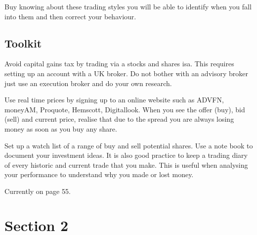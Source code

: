 Buy knowing about these trading styles you will be able to identify when you fall into them and then correct your behaviour.

\subsection*{Toolkit}
Avoid capital gains tax by trading via a stocks and shares isa. This requires setting up an account with a UK broker.
Do not bother with an advisory broker just use an execution broker and do your own research.

Use real time prices by signing up to an online website such as ADVFN, moneyAM, Proquote, Hemscott, Digitallook.
When you see the offer (buy), bid (sell) and current price, realise that due to the spread you are always losing money as soon as you buy any share.

Set up a watch list of a range of buy and sell potential shares.
Use a note book to document your investment ideas. 
It is also good practice to keep a trading diary of every historic and current trade that you make.
This is useful when analysing your performance to understand why you made or lost money.

Currently on page 55.


\section*{Section 2}








